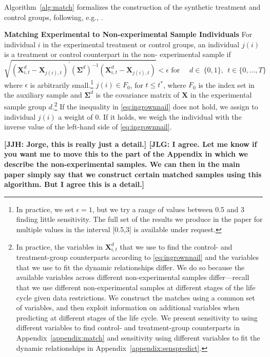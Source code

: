 Algorithm~\ref{alg:match} formalizes the construction of the synthetic treatment and control groups, following, e.g., \citet{Heckman_Ichimura_etal_1998_REStud}.

\onehalfspacing
\begin{algorithm}\label{alg:match}\textbf{Matching Experimental to Non-experimental Sample Individuals}
For individual $i$ in the experimental treatment or control groups, an individual $j(i)$ is a treatment or control counterpart in the non- experimental sample if
\begin{equation}\label{eq:ingrownnail}
\sqrt{\left( \bm{X}^{d}_{i,t} - \bm{X}_{j(i),t} \right)^{\prime} {\left( \bm{\Sigma}^d\right)}^{-1} \left(\bm{X}^{d}_{i,t} - \bm{X}_{j(i),t} \right)} < \epsilon \text{ for } \quad d \in \ \{0,1\}, \ \ t \in \{0,\dots,T\}
\end{equation}
where $\epsilon$ is arbitrarily small.\footnote{In practice, we set $\epsilon = 1$, but we try a range of values between 0.5 and 3 finding little sensitivity. The full set of the results we produce in the paper for multiple values in the interval [0.5,3] is available under request.} $j(i) \in F_0$, for $t \leq t^{\ast}$, where $F_0$ is the index set in the auxiliary sample and $\bm{\Sigma}^d$ is the covariance matrix of $\bm{X}$ in the experimental sample group $d$.\footnote{In practice, the variables in $\bm{X}^{d}_{i,t}$ that we use to find the control- and treatment-group counterparts according to \eqref{eq:ingrownnail} and the variables that we use to fit the dynamic relationships differ. We do so because the available variables across different non-experimental samples differ---recall that we use different non-experimental samples at different stages of the life cycle given data restrictions. We construct the matches using a common set of variables, and then exploit information on additional variables when predicting at different stages of the life cycle. We present sensitivity to using different variables to find control- and treatment-group counterparts in Appendix~\ref{appendix:match} and sensitivity using different variables to fit the dynamic relationships in Appendix~\ref{appendix:senspredict}.} If the inequality in \eqref{eq:ingrownnail} does not hold, we assign to individual $j(i)$ a weight of 0. If it holds, we weigh the individual with the inverse value of the left-hand side of \eqref{eq:ingrownnail}.
\end{algorithm}
\doublespacing

\textbf{[JJH: Jorge, this is really just a detail.] [JLG: I agree. Let me know if you want me to move this to the part of the Appendix in which we describe the non-experimental samples. We can then in the main paper simply say that we construct certain matched samples using this algorithm. But I agree this is a detail.]}

